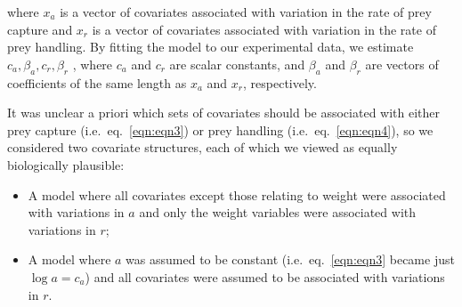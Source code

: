 \documentclass[ASNA,twocolumn]{USG} %
\begin{document}
where \begin{math}x_a\end{math} is a vector of covariates associated with variation in the rate of prey capture and \begin{math}x_r\end{math} is a vector of covariates associated with variation in the rate of prey handling. By fitting the model to our experimental data, we estimate \begin{math} c_a, \beta_a, c_r, \beta_r\end{math} , where \begin{math}c_a\end{math} and \begin{math}c_r\end{math} are scalar constants, and \begin{math}\beta_a\end{math} and \begin{math}\beta_r\end{math} are vectors of coefficients of the same length as \begin{math}x_a\end{math} and \begin{math}x_r\end{math}, respectively. 

It was unclear a priori which sets of covariates should be associated with either prey capture (i.e.\ eq.\ \ref{eqn:eqn3}) or prey handling (i.e.\ eq.\ \ref{eqn:eqn4}), so we considered two covariate structures, each of which we viewed as equally biologically plausible:
\begin{itemize}
  \item A model where all covariates except those relating to weight were associated with variations in \begin{math}a\end{math} and only the weight variables were associated with variations in \begin{math}r\end{math};
  \item A model where \begin{math}a\end{math} was assumed to be constant (i.e.\ eq.\ \ref{eqn:eqn3} became just \begin{math}\log a = c_a\end{math}) and all covariates were assumed to be associated with variations in \begin{math}r\end{math}.
  \end{itemize}
\end{document}

